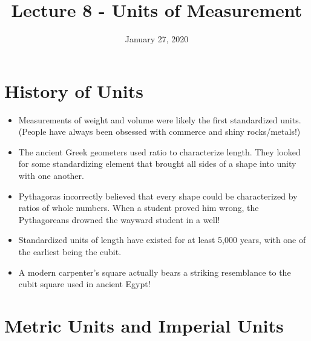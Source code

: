\documentclass{article}
\title{Lecture 8 - Units of Measurement}
\author{}
\date{January 27, 2020}
\begin{document}
\maketitle

\section*{History of Units}
\begin{itemize}
\item Measurements of weight and volume were likely the first standardized units.  (People have always been obsessed with commerce and shiny rocks/metals!)
\item The ancient Greek geometers used ratio to characterize length.  They looked for some standardizing element that brought all sides of a shape into unity with one another.
\item Pythagoras incorrectly believed that every shape could be characterized by ratios of whole numbers.  When a student proved him wrong, the Pythagoreans drowned the wayward student in a well!
\item Standardized units of length have existed for at least 5,000 years, with one of the earliest being the cubit.
\item A modern carpenter's square actually bears a striking resemblance to the cubit square used in ancient Egypt!
\end{itemize}

\section*{Metric Units and Imperial Units}
\end{document}
